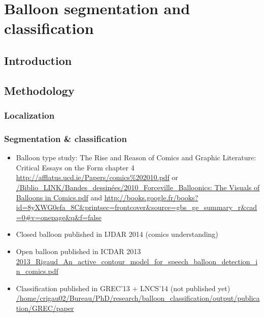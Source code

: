 \chapter{Balloon segmentation and classification}
\label{chap:be}
\graphicspath{{./chapters/6-be/figs/}}

\section{Introduction}
\label{sec:be:introduction}


\section{Methodology}
\label{sec:be:methodology}

\subsection{Localization} %
\label{sub:be:localization}


\subsection{Segmentation \& classification} %
\label{sub:be:segmentation}
\begin{itemize}
	\item Balloon type study: The Rise and Reason of Comics and Graphic Literature: Critical Essays on the Form chapter 4 \url{http://afflatus.ucd.ie/Papers/comics%202010.pdf} or \url{/Biblio_LINK/Bandes_dessinées/2010_Forceville_Balloonics: The Visuals of Balloons in Comics.pdf} and \url{http://books.google.fr/books?id=8yXWG0efa_8C&printsec=frontcover&source=gbs_ge_summary_r&cad=0#v=onepage&q&f=false}
	\item Closed balloon published in IJDAR 2014 (comics understanding)
	\item Open balloon published in ICDAR 2013 \url{2013_Rigaud_An_active_contour_model_for_speech_balloon_detection_in_comics.pdf}
	\item Classification published in GREC'13 + LNCS'14 (not published yet) \url{/home/crigau02/Bureau/PhD/research/balloon_classification/output/publication/GREC/paper}
\end{itemize}

